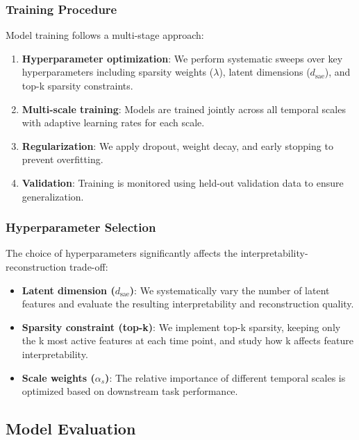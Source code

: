 \subsubsection{Training Procedure}

Model training follows a multi-stage approach:

\begin{enumerate}
\item \textbf{Hyperparameter optimization}: We perform systematic sweeps over key hyperparameters including sparsity weights ($\lambda$), latent dimensions ($d_{\text{sae}}$), and top-k sparsity constraints.

\item \textbf{Multi-scale training}: Models are trained jointly across all temporal scales with adaptive learning rates for each scale.

\item \textbf{Regularization}: We apply dropout, weight decay, and early stopping to prevent overfitting.

\item \textbf{Validation}: Training is monitored using held-out validation data to ensure generalization.
\end{enumerate}

\subsubsection{Hyperparameter Selection}

The choice of hyperparameters significantly affects the interpretability-reconstruction trade-off:

\begin{itemize}
\item \textbf{Latent dimension ($d_{\text{sae}}$)}: We systematically vary the number of latent features and evaluate the resulting interpretability and reconstruction quality.

\item \textbf{Sparsity constraint (top-k)}: We implement top-k sparsity, keeping only the k most active features at each time point, and study how k affects feature interpretability.

\item \textbf{Scale weights ($\alpha_s$)}: The relative importance of different temporal scales is optimized based on downstream task performance.
\end{itemize}

\subsection{Model Evaluation}

